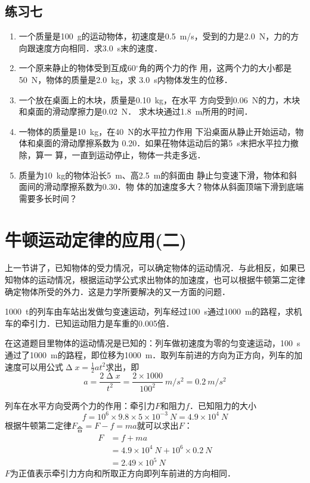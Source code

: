 \subsection*{练习七}
\begin{enumerate}
    \item 一个质量是\SI{100}{g}的运动物体，初速度是\SI{0.5}{m/s}，受到的力是\SI{2.0}{N}，力的方向跟速度方向相同．求\SI{3.0}{s}末的速度．
    \item 一个原来静止的物体受到互成60$^\circ$角的两个力的作
          用，这两个力的大小都是\SI{50}{N}，物体的质量是\SI{2.0}{kg}，求
          \SI{3.0}{s}内物体发生的位移．
    \item 一个放在桌面上的木块，质量是\SI{0.10}{kg}，在水平
          方向受到\SI{0.06}{N}的力，木块和桌面的滑动摩擦力是\SI{0.02}{N}．
          求木块通过\SI{1.8}{m}所用的时间．
    \item 一物体的质量是\SI{10}{kg}，在\SI{40}{N}的水平拉力作用
          下沿桌面从静止开始运动，物体和桌面的滑动摩擦系数为
          0.20．如果茌物体运动后的第\SI{5}{s}末把水平拉力撤除，算一
          算，一直到运动停止，物体一共走多远．
    \item  质量为\SI{10}{kg}的物体沿长\SI{5}{m}、高\SI{2.5}{m}的斜面由
          静止匀变速下滑，物体和斜面间的滑动摩擦系数为0.30．物
          体的加速度多大？物体从斜面顶端下滑到底端需要多长时间？
\end{enumerate}
\newpage
\section{牛顿运动定律的应用(二)}
上一节讲了，已知物体的受力情况，可以确定物体的运动情况．与此相反，如果已知物体的运动情况，根据运动学公式求出物体的加速度，也可以根据牛顿第二定律确定物体所受的外力．这是力学所要解决的又一方面的问题．

\begin{example}
    \SI{1000}{t}的列车由车站出发做匀变速运动，列车经过\SI{100}{s}通过\SI{1000}{m}的路程，求机车的牵引力．已知运动阻力是车重的0.005倍．
\end{example}

\begin{solution}
    在这道题目里物体的运动情况是已知的：列车做初速度为零的匀变速运动，\SI{100}{s}通过了\SI{1000}{m}的路程，即位移为\SI{1000}{m}．取列车前进的方向为正方向，列车的加速度可以用公式$\upDelta x=\frac{1}{2}at^2$求出，即
    \[a=\frac{2\upDelta x}{t^2}=\frac{2\times 1000}{100^2}~\si{m/s^2}=\SI{0.2}{m/s^2} \]

    列车在水平方向受两个力的作用：牵引力$F$和阻力$f$．已知阻力的大小
    \[f=10^6\times 9.8\times 5\times 10^{-3}~\si{N}=4.9\times 10^4 ~\si{N} \]
    根据牛顿第二定律$F_{\text{合}}=F-f=ma$就可以求出$F$：
    \[\begin{split}
            F & =f+ma                                        \\
              & =4.9\times 10^4~\si{N}+10^6\times 0.2~\si{N} \\
              & =2.49\times 10^5~\si{N}
        \end{split} \]
    $F$为正值表示牵引力方向和所取正方向即列车前进的方向相同．
\end{solution}


